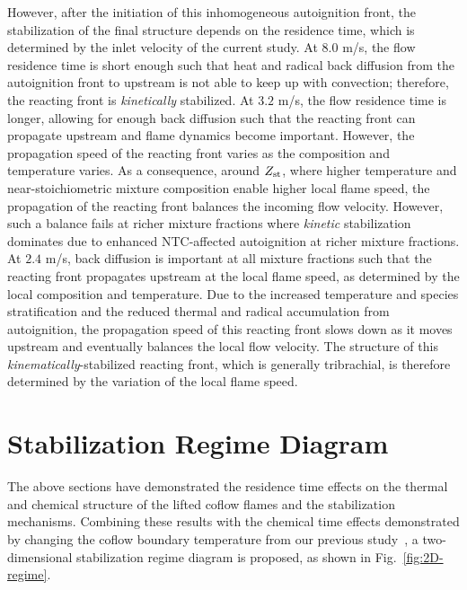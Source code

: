 \documentclass{wssci}
\begin{document}
However, after the initiation of this inhomogeneous autoignition front, the stabilization of the final structure depends on the residence time, which is determined by the inlet velocity of the current study.  At $8.0$ m/s, the flow residence time is short enough such that heat and radical back diffusion from the autoignition front to upstream is not able to keep up with convection; therefore, the reacting front is \emph{kinetically} stabilized.  At $3.2$ m/s, the flow residence time is longer, allowing for enough back diffusion such that the reacting front can propagate upstream and flame dynamics become important.  However, the propagation speed of the reacting front varies as the composition and temperature varies.  As a consequence, around $Z_{\rm st}$, where higher temperature and near-stoichiometric mixture composition enable higher local flame speed, the propagation of the reacting front balances the incoming flow velocity.  However, such a balance fails at richer mixture fractions where \emph{kinetic} stabilization dominates due to enhanced NTC-affected autoignition at richer mixture fractions.  At $2.4$ m/s, back diffusion is important at all mixture fractions such that the reacting front propagates upstream at the local flame speed, as determined by the local composition and temperature.  Due to the increased temperature and species stratification and the reduced thermal and radical accumulation from autoignition, the propagation speed of this reacting front slows down as it moves upstream and eventually balances the local flow velocity.  The structure of this \emph{kinematically}-stabilized reacting front, which is generally tribrachial, is therefore determined by the variation of the local flame speed.


        
\section{Stabilization Regime Diagram}

The above sections have demonstrated the residence time effects on the thermal and chemical structure of the lifted coflow flames and the stabilization mechanisms.  Combining these results with the chemical time effects demonstrated by changing the coflow boundary temperature from our previous study~\cite{deng15}, a two-dimensional stabilization regime diagram is proposed, as shown in Fig.~\ref{fig:2D-regime}.  
\end{document}
